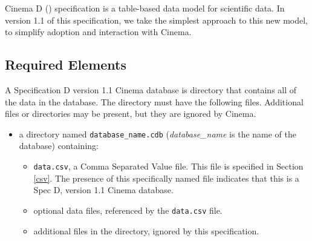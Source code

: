 Cinema D (\dietrich) specification is a table-based data model for scientific
data. In version 1.1 of this specification, we take the simplest approach to
this new model, to simplify adoption and interaction with Cinema.

\subsection{Required Elements}

A Specification D version 1.1 Cinema database is directory that contains all of
the data in the database. The directory must have the following files.
Additional files or directories may be present, but they are ignored by Cinema.

\begin{itemize}
\item a directory named \texttt{\small database\_name.cdb} 
  ({\em database\_name} is the name of the database) containing:
\begin{itemize}
\item \texttt{\small data.csv}, a Comma Separated Value file. This file is
  specified in Section \ref{csv}. The presence of this specifically named file 
  indicates that this is a Spec D, version 1.1 Cinema database.
\item optional data files, referenced by the \texttt{\small data.csv} file.
\item additional files in the directory, ignored by this specification.
\end{itemize}
\end{itemize}

